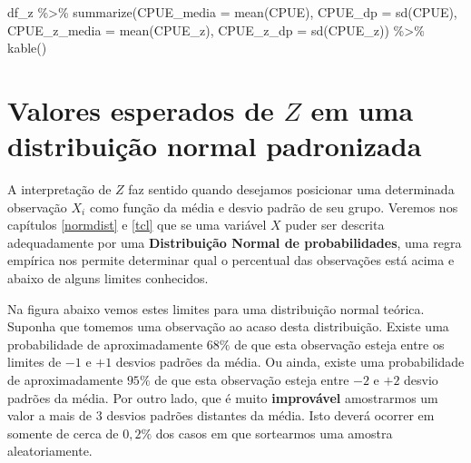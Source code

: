 \documentclass[
]{book}
\newenvironment{Shaded}{\begin{snugshade}}{\end{snugshade}}
\newcommand{\AttributeTok}[1]{\textcolor[rgb]{0.77,0.63,0.00}{#1}}
\newcommand{\FunctionTok}[1]{\textcolor[rgb]{0.00,0.00,0.00}{#1}}
\newcommand{\NormalTok}[1]{#1}
\newcommand{\SpecialCharTok}[1]{\textcolor[rgb]{0.00,0.00,0.00}{#1}}
\begin{document}
\begin{Shaded}
\begin{Highlighting}[]
\NormalTok{df\_z }\SpecialCharTok{\%\textgreater{}\%} 
  \FunctionTok{summarize}\NormalTok{(}\AttributeTok{CPUE\_media =} \FunctionTok{mean}\NormalTok{(CPUE),}
            \AttributeTok{CPUE\_dp =} \FunctionTok{sd}\NormalTok{(CPUE),}
            \AttributeTok{CPUE\_z\_media =} \FunctionTok{mean}\NormalTok{(CPUE\_z),}
            \AttributeTok{CPUE\_z\_dp =} \FunctionTok{sd}\NormalTok{(CPUE\_z)) }\SpecialCharTok{\%\textgreater{}\%} 
  \FunctionTok{kable}\NormalTok{()}
\end{Highlighting}
\end{Shaded}

\hypertarget{valores-esperados-de-z-em-uma-distribuiuxe7uxe3o-normal-padronizada}{%
\section{\texorpdfstring{Valores esperados de \(Z\) em uma distribuição normal padronizada}{Valores esperados de Z em uma distribuição normal padronizada}}\label{valores-esperados-de-z-em-uma-distribuiuxe7uxe3o-normal-padronizada}}

A interpretação de \(Z\) faz sentido quando desejamos posicionar uma determinada observação \(X_i\) como função da média e desvio padrão de seu grupo. Veremos nos capítulos \ref{normdist} e \ref{tcl} que se uma variável \(X\) puder ser descrita adequadamente por uma \textbf{Distribuição Normal de probabilidades}, uma regra empírica nos permite determinar qual o percentual das observações está acima e abaixo de alguns limites conhecidos.

Na figura abaixo vemos estes limites para uma distribuição normal teórica. Suponha que tomemos uma observação ao acaso desta distribuição. Existe uma probabilidade de aproximadamente \(68\%\) de que esta observação esteja entre os limites de \(-1\) e \(+1\) desvios padrões da média. Ou ainda, existe uma probabilidade de aproximadamente \(95\%\) de que esta observação esteja entre \(-2\) e \(+2\) desvio padrões da média. Por outro lado, que é muito \textbf{improvável} amostrarmos um valor a mais de \(3\) desvios padrões distantes da média. Isto deverá ocorrer em somente de cerca de \(0,2\%\) dos casos em que sortearmos uma amostra aleatoriamente.
\end{document}
